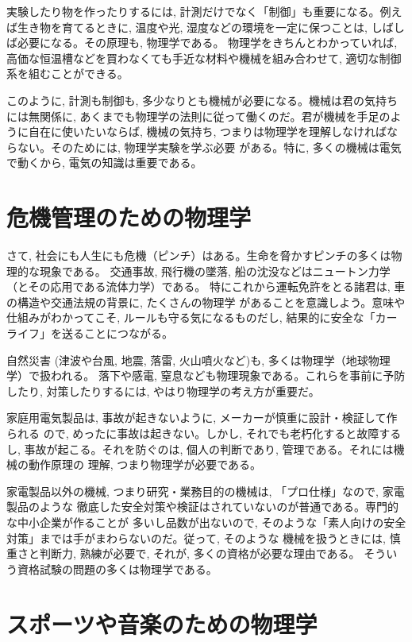 実験したり物を作ったりするには, 計測だけでなく「制御」も重要になる。例えば生き物を育てるときに, 
温度や光, 湿度などの環境を一定に保つことは, しばしば必要になる。その原理も, 物理学である。
物理学をきちんとわかっていれば, 高価な恒温槽などを買わなくても手近な材料や機械を組み合わせて, 
適切な制御系を組むことができる。

このように, 計測も制御も, 多少なりとも機械が必要になる。機械は君の気持ちには無関係に, 
あくまでも物理学の法則に従って働くのだ。君が機械を手足のように自在に使いたいならば, 
機械の気持ち, つまりは物理学を理解しなければならない。そのためには, 物理学実験を学ぶ必要
がある。特に, 多くの機械は電気で動くから, 電気の知識は重要である。
\hv


\section{危機管理のための物理学}

さて, 社会にも人生にも危機（ピンチ）はある。生命を脅かすピンチの多くは物理的な現象である。
交通事故, 飛行機の墜落, 船の沈没などはニュートン力学（とその応用である流体力学）である。
特にこれから運転免許をとる諸君は, 車の構造や交通法規の背景に, たくさんの物理学
があることを意識しよう。意味や仕組みがわかってこそ, ルールも守る気になるものだし, 
結果的に安全な「カーライフ」を送ることにつながる。

自然災害 (津波や台風, 地震, 落雷, 火山噴火など)も, 多くは物理学（地球物理学）で扱われる。
落下や感電, 窒息なども物理現象である。これらを事前に予防したり, 対策したりするには, 
やはり物理学の考え方が重要だ。

家庭用電気製品は, 事故が起きないように, メーカーが慎重に設計・検証して作られる
ので, めったに事故は起きない。しかし, それでも老朽化すると故障するし, 
事故が起こる。それを防ぐのは, 個人の判断であり, 管理である。それには機械の動作原理の
理解, つまり物理学が必要である。

家電製品以外の機械, つまり研究・業務目的の機械は, 「プロ仕様」なので, 家電製品のような
徹底した安全対策や検証はされていないのが普通である。専門的な中小企業が作ることが
多いし品数が出ないので, そのような「素人向けの安全対策」までは手がまわらないのだ。従って, そのような
機械を扱うときには, 慎重さと判断力, 熟練が必要で, それが, 多くの資格が必要な理由である。
そういう資格試験の問題の多くは物理学である。
\hv


\section{スポーツや音楽のための物理学}

